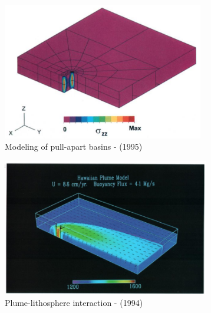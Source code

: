 \begin{center}
\begin{minipage}{0.45\textwidth}
\centering
\includegraphics[height=6cm]{images/history/katl95}\\
{\captionfont Modeling of pull-apart basins - \textcite{katl95} (1995)}
\end{minipage}\hfill
\begin{minipage}{0.45\textwidth}
\centering
\includegraphics[height=6cm]{images/history/rich94}\\
{\captionfont Plume-lithosphere interaction - \textcite{rich94} (1994)}
\end{minipage}
\end{center}

